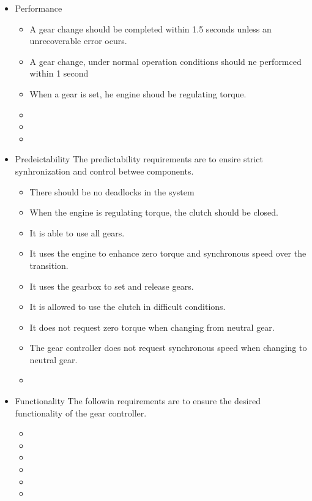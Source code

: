 \begin{itemize}
	\item Performance
	\begin{itemize}
		\item  A gear change should be completed within 1.5 seconds unless an unrecoverable error ocurs.
		\item A gear change, under normal operation conditions should ne performced within 1 second
		\item When a gear is set, he engine shoud  be regulating torque.
		\item 
		\item 
		\item 
	\end{itemize}
	
	\item Predeictability The predictability requirements are to ensire strict synhronization and control betwee components.
	\begin{itemize}
			\item   There should be no deadlocks in the system
		\item When the engine is regulating torque, the clutch should be closed.
		\item It is able to use all gears.
		\item It uses the engine to enhance zero torque and synchronous speed over the transition.
		\item It uses the gearbox to set and release gears.
		\item   It is allowed to use the clutch in difficult conditions.
		\item It does not request zero torque when changing from neutral gear.
		\item The gear controller does not request synchronous speed when changing to neutral gear.
		\item
	\end{itemize}
	
	
	\item Functionality The followin requirements are to ensure the desired functionality of the gear controller.
	\begin{itemize}
			\item 
		\item 
		\item 
		\item 
		\item 
		\item 
	\end{itemize}
	

\end{itemize}
